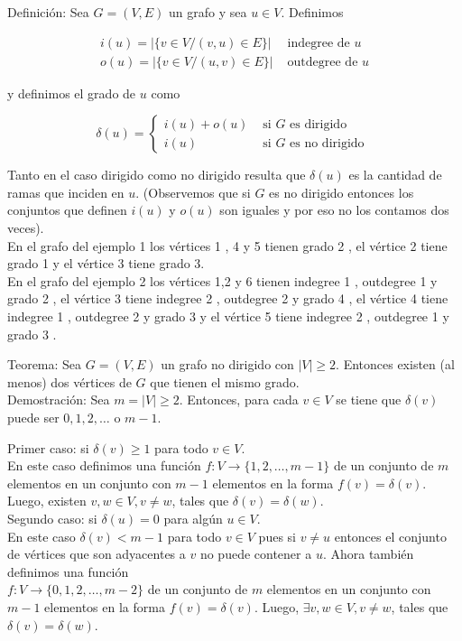 \documentclass[10pt]{article}
\begin{document}
Definición: Sea $G=(V, E)$ un grafo y sea $u \in V$. Definimos

$$
\begin{array}{ll}
i(u)=|\{v \in V /(v, u) \in E\}| & \text { indegree de } u \\
o(u)=|\{v \in V /(u, v) \in E\}| & \text { outdegree de } u
\end{array}
$$

y definimos el grado de $u$ como

$$
\delta(u)= \begin{cases}i(u)+o(u) & \text { si } G \text { es dirigido } \\ i(u) & \text { si } G \text { es no dirigido }\end{cases}
$$

Tanto en el caso dirigido como no dirigido resulta que $\delta(u)$ es la cantidad de ramas que inciden en $u$. (Observemos que si $G$ es no dirigido entonces los conjuntos que definen $i(u)$ y $o(u)$ son iguales y por eso no los contamos dos veces).\\
En el grafo del ejemplo 1 los vértices 1 , 4 y 5 tienen grado 2 , el vértice 2 tiene grado 1 y el vértice 3 tiene grado 3.\\
En el grafo del ejemplo 2 los vértices 1,2 y 6 tienen indegree 1 , outdegree 1 y grado 2 , el vértice 3 tiene indegree 2 , outdegree 2 y grado 4 , el vértice 4 tiene indegree 1 , outdegree 2 y grado 3 y el vértice 5 tiene indegree 2 , outdegree 1 y grado 3 .

Teorema: Sea $G=(V, E)$ un grafo no dirigido con $|V| \geq 2$. Entonces existen (al menos) dos vértices de $G$ que tienen el mismo grado.\\
Demostración: Sea $m=|V| \geq 2$. Entonces, para cada $v \in V$ se tiene que $\delta(v)$ puede ser $0,1,2, \ldots$ o $m-1$.

Primer caso: si $\delta(v) \geq 1$ para todo $v \in V$.\\
En este caso definimos una función $f: V \longrightarrow\{1,2, \ldots, m-1\}$ de un conjunto de $m$ elementos en un conjunto con $m-1$ elementos en la forma $f(v)=\delta(v)$. Luego, existen $v, w \in V, v \neq w$, tales que $\delta(v)=\delta(w)$.\\
Segundo caso: si $\delta(u)=0$ para algún $u \in V$.\\
En este caso $\delta(v)<m-1$ para todo $v \in V$ pues si $v \neq u$ entonces el conjunto de vértices que son adyacentes a $v$ no puede contener a $u$. Ahora también definimos una función\\
$f: V \longrightarrow\{0,1,2, \ldots, m-2\}$ de un conjunto de $m$ elementos en un conjunto con $m-1$ elementos en la forma $f(v)=\delta(v)$. Luego, $\exists v, w \in V, v \neq w$, tales que $\delta(v)=\delta(w)$.
\end{document}
